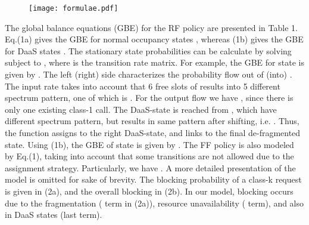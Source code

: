 \documentclass[letterpaper,10pt]{article}
\begin{document}
\vspace{-3mm}
\begin{figure}[ht!]
 \centering
\texttt{[image: formulae.pdf]}
\label{table:formulae}\vspace{-7mm}
\end{figure}
The global balance equations (GBE) for the RF policy are presented in Table 1. Eq.(1a) gives the GBE for normal occupancy states , whereas (1b) gives the GBE for DaaS states . The stationary state probabilities   can be calculate by solving   subject to , where  is the transition rate matrix. For example, the GBE for state  is given by . The left (right) side characterizes the probability flow out of (into) . The input rate  takes into account that 6 free slots of  results into 5 different spectrum pattern, one of which is . For the output flow we have , since there is only one existing class-1 call. The DaaS-state  is reached from , which have different spectrum pattern, but results in same pattern after shifting, i.e. . Thus, the function  assigns to the right DaaS-state, and  links to the final de-fragmented state. Using (1b), the GBE of state  is given by . The FF policy is also modeled by Eq.(1), taking into account that some transitions are not allowed due to the assignment strategy. Particularly, we have . A more detailed presentation of the model is omitted for sake of brevity. The blocking probability of a class-k request is given in (2a), and the overall blocking in (2b). In our model, blocking occurs due to the fragmentation ( term in (2a)), resource unavailability ( term), and also in DaaS states (last term).
 
\vspace{-2mm}
\end{document}

